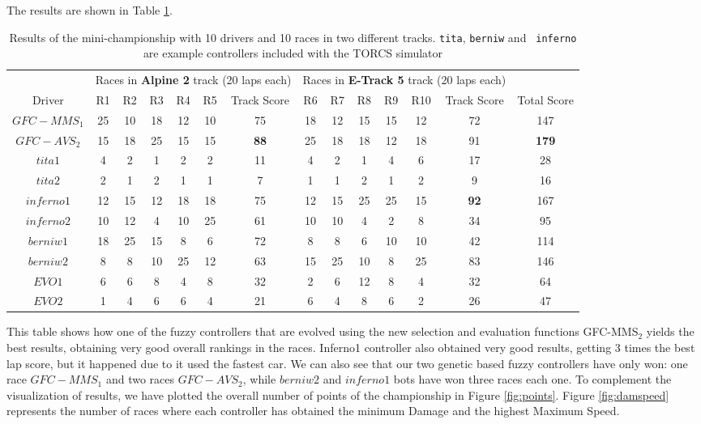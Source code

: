 \documentclass[conference]{IEEEtran}
\begin{document}
The results are shown in Table \ref{tab:chsresults}. 
%
\begin{table}[ht]
  \centering
  {\scriptsize
    \caption{ Results of the mini-championship with 10 drivers and 10
      races in two different tracks. {\tt tita}, {\tt berniw} and {\tt
      inferno} are example controllers included with the TORCS
    simulator \cite{WebTORCS}}
    {
			\begin{tabular}{|c||c|c|c|c|c|c||c|c|c|c|c|c||c|}
				\hline
			&\multicolumn{6}{|c|}{Races in \textbf{Alpine 2} track (20 laps each)} &	\multicolumn{6}{|c|}{Races in \textbf{E-Track 5} track (20 laps each)}&\\
					\cline{2-13}
				Driver&{R1}&{R2}&{R3}&{R4}&{R5}&Track Score&{R6}&{R7}&{R8}& {R9}&{R10}&Track Score& Total Score\\
				\hline
				$GFC-MMS_1$&	25&	10&	18&	12&	10&75&	18&	12&	15&	15&	12&72&147\\
				$GFC-AVS_2$&	15&	18&	25&	15&	15&\textbf{88}&	25&	18&	18&	12&18&91&\textbf{179}\\
				$tita1$&	4&	2&	1&	2&	2&11&	4&	2&	1&	4&	6&17&28\\
				$tita2$&	2&	1&	2&	1&	1&7&	1&	1&	2&	1&	2&9&16\\
				$inferno1$&12&15&	12&	18&	18&75&	12&	15&	25&	25&	15&\textbf{92}&167\\
				$inferno2$&10&12&	4&	10&	25&61&	10&	10&	4&	2&	8&34&95\\
				$berniw1$&	18&	25&	15&	8&	6&72&	8&	8&	6&	10&	10&42&114\\
				$berniw2$	&8&	8&	10&	25&	12&63&	15&	25&	10&	8&	25&83&146\\
				$EVO1$&	6&	6&	8&	4&	8&32&	2&	6&	12&	8&	4&32&64\\
				$EVO2$&	1&	4&	6&	6&	4&21&	6&	4&	8&	6&	2&26&47\\
				\hline
				
			\end{tabular}
		}\label{tab:chsresults}
	}
\end{table}
%
This table shows how one of the fuzzy controllers that are evolved using the
new selection and evaluation functions {\sf GFC-MMS$_2$} yields the best results, obtaining very good overall rankings in the races. Inferno1 controller also obtained very good results, getting 3 times the best lap score, but it happened due to it used the fastest car.
%
We can also see that our two genetic based fuzzy controllers have only won: one race $GFC-MMS_1$ and two races $GFC-AVS_2$, while $berniw2$ and $inferno1$ bots have won three races each one. 
To complement the visualization of results, we have plotted the overall number of points of the championship in Figure \ref{fig:points}. Figure \ref{fig:damspeed} represents the number of races where each controller has obtained the minimum Damage and the highest Maximum Speed.
\end{document}

